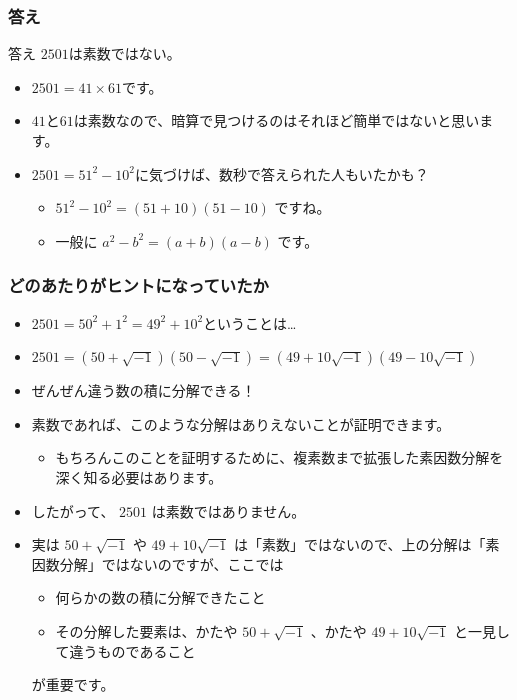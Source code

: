 \documentclass[dvipdfmx]{beamer}
\begin{document}
  \begin{frame}
    \frametitle{答え}
  
    \begin{block}{答え}
      $2501$は素数ではない。
    \end{block}
    \begin{itemize}
      \item $2501 = 41 \times 61$です。
      \item $41$と$61$は素数なので、暗算で見つけるのはそれほど簡単ではないと思います。
      \item $2501 = 51^2 - 10^2$に気づけば、数秒で答えられた人もいたかも？
      \begin{itemize}
        \item $51^2 - 10^2 = (51+10)(51-10)$ ですね。
        \item 一般に $a^2 - b^2 = (a+b)(a-b)$ です。
      \end{itemize}
    \end{itemize}
  
  \end{frame}

  \begin{frame}
    \frametitle{どのあたりがヒントになっていたか}
  
    \begin{itemize}
      \item $2501 = 50^2 + 1^2 = 49^2 + 10^2$ということは…
      \item $2501 = (50+\sqrt{-1})(50-\sqrt{-1}) = (49+10\sqrt{-1})(49-10\sqrt{-1})$
      \item ぜんぜん違う数の積に分解できる！
      \item 素数であれば、このような分解はありえないことが証明できます。
      \begin{itemize}
        \item もちろんこのことを証明するために、複素数まで拡張した素因数分解を深く知る必要はあります。
      \end{itemize}
      \item したがって、 $2501$ は素数ではありません。
      \item 実は $50+\sqrt{-1}$ や $49+10\sqrt{-1}$ は「素数」ではないので、上の分解は「素因数分解」ではないのですが、ここでは
      \begin{itemize}
        \item 何らかの数の積に分解できたこと
        \item その分解した要素は、かたや $50+\sqrt{-1}$ 、かたや $49+10\sqrt{-1}$ と一見して違うものであること
      \end{itemize}
      が重要です。
    \end{itemize}
  
  \end{frame}
\end{document}
